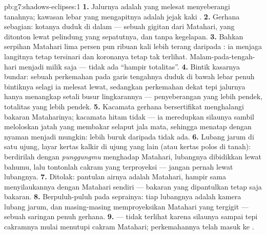 \begin{solution}{pb:g7:shadows-eclipses:1}
\textbf{1.} Jalurnya adalah    yang melesat
menyeberangi tanahnya; kawasan lebar yang mengapitnya adalah jejak
kaki .
\textbf{2.} Gerhana sebagian: kotanya duduk di dalam  ---
sebuah gigitan dari Matahari, yang ditonton lewat pelindung yang
sepatutnya, dan tanpa kegelapan.
\textbf{3.} Bahkan serpihan Matahari lima persen pun ribuan kali lebih
terang daripada  : ia menjaga langitnya tetap
tersinari dan koronanya tetap tak terlihat. Malam-pada-tengah-hari
menjadi milik  saja --- tidak ada ``hampir totalitas''.
\textbf{4.} Bintik  kasarnya bundar: sebuah perkemahan pada
garis tengahnya duduk di bawah lebar penuh bintiknya selagi ia melesat
lewat, sedangkan perkemahan dekat tepi jalurnya hanya menangkap
setali busur lingkarannya --- penyeberangan yang lebih pendek,
totalitas yang lebih pendek.
\textbf{5.} Kacamata gerhana bersertifikat menghalangi bakaran
Mataharinya; kacamata hitam tidak --- ia meredupkan silaunya sambil
meloloskan jatah yang membakar selaput jala mata, sehingga menatap
dengan nyaman menjadi mungkin: lebih buruk daripada tidak ada.
\textbf{6.} Lubang jarum di satu ujung, layar kertas kalkir di ujung
yang lain (atau kertas polos di tanah): berdirilah dengan
\emph{punggungmu} menghadap Matahari, lubangnya dibidikkan lewat
bahumu, lalu tontonlah cakram yang terproyeksi --- jangan pernah lewat
lubangnya.
\textbf{7.} Ditolak: pantulan airnya adalah   Matahari,
hampir sama menyilaukannya dengan Matahari sendiri --- bakaran yang
dipantulkan tetap saja bakaran.
\textbf{8.} Berpuluh-puluh   pada seprainya: tiap
lubangnya adalah kamera lubang jarum, dan masing-masing memproyeksikan
Matahari yang tergigit --- sebuah saringan penuh gerhana.
\textbf{9.}  --- tidak terlihat karena silaunya sampai tepi
cakramnya mulai menutupi cakram Matahari; perkemahannya telah masuk ke
.

\end{solution}

